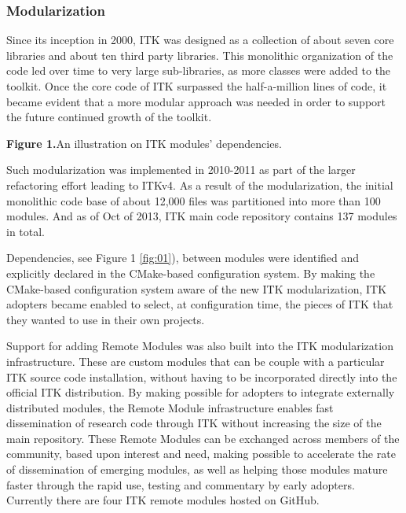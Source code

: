 \documentclass{frontiersENG} %
\begin{document}
\subsubsection{Modularization}
Since its inception in 2000, ITK was designed as a collection of about seven
core libraries and about ten third party libraries.  This monolithic
organization of the code led over time to very large sub-libraries, as more
classes were added to the toolkit. Once the core code of ITK surpassed the
half-a-million lines of code, it became evident that a more modular approach
was needed in order to support the future continued growth of the toolkit.

\textbf{Figure 1.}{An illustration on ITK modules' dependencies.}\label{fig:01}

Such modularization was implemented in 2010-2011 as part of the larger
refactoring effort leading to ITKv4.  As a result of the modularization, the
initial monolithic code base of about 12,000 files was partitioned into more
than 100 modules.  And as of Oct of 2013, ITK main code repository contains
137 modules in total.

Dependencies, see Figure 1 \ref{fig:01}), between modules were identified and
explicitly declared in the CMake-based configuration system. By making the
CMake-based configuration system aware of the new ITK modularization, ITK
adopters became enabled to select, at configuration time, the pieces of ITK
that they wanted to use in their own projects.

Support for adding Remote Modules was also built into the ITK modularization
infrastructure. These are custom modules that can be couple with a particular
ITK source code installation, without having to be incorporated directly into
the official ITK distribution. By making possible for adopters to integrate
externally distributed modules, the Remote Module infrastructure enables fast
dissemination of research code through ITK without increasing the size of the
main repository. These Remote Modules can be exchanged across members of the
community, based upon interest and need, making possible to accelerate the rate
of dissemination of emerging modules, as well as helping those modules mature
faster through the rapid use, testing and commentary by early adopters. Currently
there are four ITK remote modules hosted on GitHub.
\end{document}
